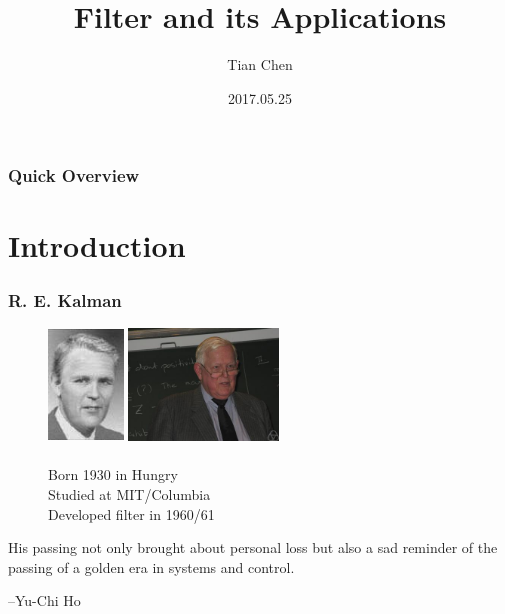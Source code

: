 \documentclass[14pt,hyperref={CJKbookmarks=true}]{beamer}
\theoremstyle{plain}
\theoremstyle{definition}
\theoremstyle{remark}
\begin{document}


\title[IACAS]{Filter and its Applications}
\author{Tian Chen}
\date[]{2017.05.25}


\begin{frame}
\titlepage
\end{frame}


\begin{frame}
\frametitle{Quick Overview}
\small\tableofcontents
\end{frame}


\section{Introduction}
\frame{\tableofcontents[currentsection]}

\begin{frame}
\frametitle{R. E. Kalman}
\small
\begin{figure}
\centering
\begin{minipage}[t]{0.3\textwidth}
\centering
\includegraphics[width=2cm,height=3cm]{kalman0.jpg}
\end{minipage}
\begin{minipage}[t]{0.3\textwidth}
\centering
\includegraphics[width=4cm,height=3cm]{kalman.jpg}
\end{minipage}
\caption{\\Born 1930 in Hungry\\
Studied at MIT/Columbia\\
Developed filter in 1960/61}
\label{fig:graph}
\end{figure}
\begin{displayquote}\scriptsize
His passing not only brought about personal loss but also a sad  reminder of the passing of a golden era in systems and control.

\hfill --Yu-Chi Ho
\end{displayquote}

\end{frame}
\end{document}
